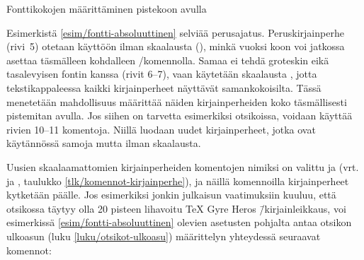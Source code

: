 \begin{esimerkki*}

  \caption{Fonttikokojen määrittäminen pistekoon avulla}
  \label{esim/fontti-absoluuttinen}
\end{esimerkki*}

Esimerkistä \ref{esim/fontti-absoluuttinen} selviää perusajatus.
Peruskirjainperhe (rivi~5) otetaan käyttöön ilman skaalausta
(), minkä vuoksi koon voi jatkossa asettaa täsmälleen
kohdalleen \-/komennolla. Samaa ei tehdä groteskin
eikä tasalevyisen fontin kanssa (rivit 6--7), vaan käytetään skaalausta
, jotta tekstikappaleessa kaikki kirjainperheet
näyttävät samankokoisilta. Tässä menetetään mahdollisuus määrittää
näiden kirjainperheiden koko täsmällisesti pistemitan avulla. Jos siihen
on tarvetta esimerkiksi otsikoissa, voidaan käyttää rivien 10--11
komentoja. Niillä luodaan uudet kirjainperheet, jotka ovat käytännössä
samoja mutta ilman skaalausta.

Uusien skaalaamattomien kirjainperheiden komentojen nimiksi on valittu
 ja  (vrt.
 ja , taulukko
\ref{tlk/komennot-kirjainperhe}), ja näillä komennoilla kirjainperheet
kytketään päälle. Jos esimerkiksi jonkin julkaisun vaatimuksiin kuuluu,
että otsikossa täytyy olla 20 pisteen lihavoitu TeX Gyre Heros
\=/kirjainleikkaus, voi esimerkissä \ref{esim/fontti-absoluuttinen}
olevien asetusten pohjalta antaa otsikon ulkoasun (luku
\ref{luku/otsikot-ulkoasu}) määrittelyn yhteydessä seuraavat komennot:

